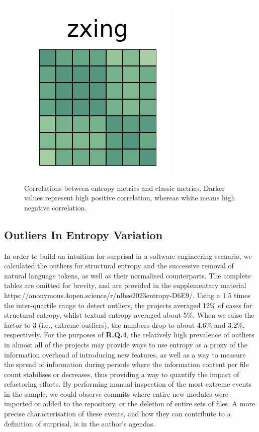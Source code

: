 \documentclass[10pt,conference]{IEEEtran}
\begin{document}
\begin{figure}[htb!]
 \includegraphics[width=\heatmapWidth, keepaspectratio]{correlations-classic/zxing-grids.png} 
\caption{Correlations between entropy metrics and classic metrics. Darker values represent high positive correlation, whereas white means high negative correlation.}
\label{fig:classic-correlations}
\end{figure}

\subsection{Outliers In Entropy Variation}
In order to build an intuition for surprisal in a software engineering scenario, we calculated the outliers for structural entropy and the successive removal of natural language tokens, as well as their normalised counterparts. The complete tables are omitted for brevity, and are provided in the supplementary material https://anonymous.4open.science/r/nlbse2023entropy-D6E9/.
Using a 1.5 times the inter-quartile range to detect outliers, the projects averaged 12\% of cases for structural entropy, whilst textual entropy averaged about 5\%. When we raise the factor to 3 (i.e., extreme outliers), the numbers drop to about 4.6\% and 3.2\%, respectively. For the purposes of \textbf{R.Q.4}, the relatively high prevalence of outliers in almost all of the projects may provide ways to use entropy as a proxy of the information overhead of introducing new features, as well as a way to measure the spread of information during periods where the information content per file count stabilises or decreases, thus providing a way to quantify the impact of refactoring efforts.
By performing manual inspection of the most extreme events in the sample, we could observe commits where entire new modules were imported or added to the repository, or the deletion of entire sets of files. A more precise characterisation of these events, and how they can contribute to a definition of surprisal, is in the author's agendas.
\end{document}
